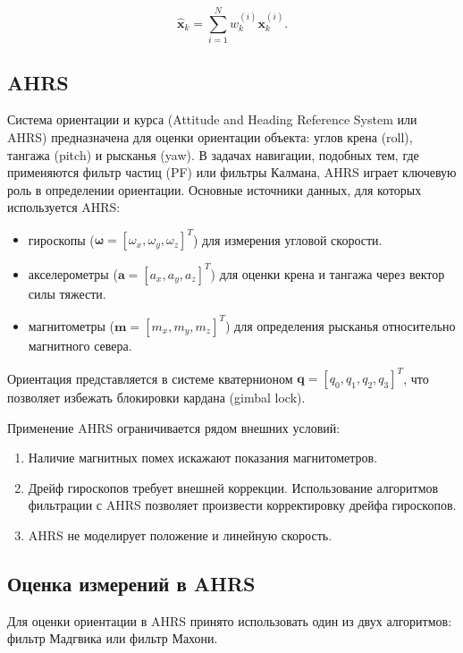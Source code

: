 \begin{equation}
    \hat{\mathbf{x}}_k = \sum_{i=1}^N w_k^{(i)} \mathbf{x}_k^{(i)}.
\end{equation}

\subsection{AHRS}

Система ориентации и курса (Attitude and Heading Reference System или AHRS) предназначена для оценки
ориентации объекта: углов крена (roll), тангажа (pitch) и рысканья (yaw).
В задачах навигации, подобных тем, где применяются фильтр частиц (PF) или фильтры Калмана,
AHRS играет ключевую роль в определении ориентации.
Основные источники данных, для которых используется AHRS: 
\begin{itemize}
    \item гироскопы (\(\boldsymbol{\omega} = [\omega_x, \omega_y, \omega_z]^T\)) для измерения угловой скорости.
    \item акселерометры (\(\mathbf{a} = [a_x, a_y, a_z]^T\)) для оценки крена и тангажа через вектор силы тяжести.
    \item магнитометры (\(\mathbf{m} = [m_x, m_y, m_z]^T\)) для определения рысканья относительно магнитного севера.
\end{itemize}

Ориентация представляется в системе кватернионом \(\mathbf{q} = [q_0, q_1, q_2, q_3]^T\), что позволяет
избежать блокировки кардана (gimbal lock).

Применение AHRS ограничивается рядом внешних условий:

\begin{enumerate}[label=\arabic*]
    \item Наличие магнитных помех искажают показания магнитометров.
    \item Дрейф гироскопов требует внешней коррекции. Использование алгоритмов фильтрации
	    с AHRS позволяет произвести корректировку дрейфа гироскопов.
    \item AHRS не моделирует положение и линейную скорость.
\end{enumerate}

\subsection{Оценка измерений в AHRS}

Для оценки ориентации в AHRS принято использовать один из двух алгоритмов: фильтр Мадгвика или фильтр Махони.

